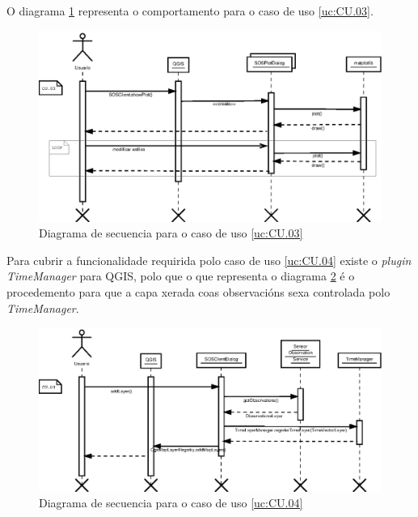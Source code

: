 O diagrama \ref{fig:diaSeq3} representa o comportamento para o caso de uso \ref{uc:CU.03}.
\begin{figure}[H]
 \centering
 \includegraphics[width=.9\textwidth]{images/seq3.eps}
 \caption{Diagrama de secuencia para o caso de uso \ref{uc:CU.03}}
 \label{fig:diaSeq3}
\end{figure}

Para cubrir a funcionalidade requirida polo caso de uso \ref{uc:CU.04} existe o \emph{plugin} \emph{TimeManager} para QGIS, polo que o que representa o diagrama \ref{fig:diaSeq4} é o procedemento para que a capa xerada coas observacións sexa controlada polo \emph{TimeManager}.
\begin{figure}[H]
 \centering
 \includegraphics[width=.9\textwidth]{images/seq4.eps}
 \caption{Diagrama de secuencia para o caso de uso \ref{uc:CU.04}}
 \label{fig:diaSeq4}
\end{figure}